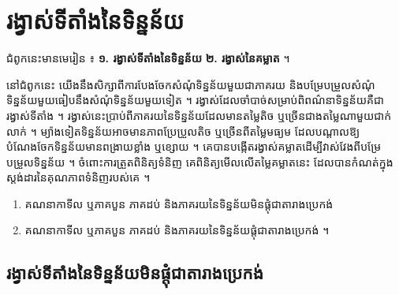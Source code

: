 \chapter{រង្វាស់ទីតាំងនៃទិន្នន័យ}

\begin{note}[ជំពូកទី ៧ ៖ ស្ថិតិ]
ជំពូកនេះមានមេរៀន ៖ \textbf{១. រង្វាស់ទីតាំងនៃទិន្នន័យ} \quad \textbf{២. រង្វាស់នៃគម្លាត} ។

នៅជំពូកនេះ យើងនឹងសិក្សាពីការបែងចែកសំណុំទិន្នន័យមួយជាភាគរយ និងបម្រែបម្រួលសំណុំទិន្នន័យមួយធៀបនឹងសំណុំទិន្នន័យមួយទៀត ។ រង្វាស់ដែលចាំបាច់សម្រាប់ពិពណ៌នាទិន្នន័យគឺជារង្វាស់ទីតាំង ។ រង្វាស់នេះប្រាប់ពីភាគរយនៃទិន្នន័យដែលមានតម្លៃតិច ឬច្រើនជាងតម្លៃណាមួយជាក់លាក់ ។ ម្យ៉ាងទៀតទិន្នន័យអាចមានភាពប្រែប្រួលតិច ឬច្រើនពីតម្លៃមធ្យម ដែលបណ្ដាលឱ្យបំណែងចែកទិន្នន័យមានពង្រាយខ្លាំង ឬខ្សោយ ។ គេបានបង្កើតរង្វាស់គម្លាតដើម្បីវាស់វែងពីបម្រែបម្រួលទិន្នន័យ ។ ចំពោះការត្រួតពិនិត្យទំនិញ គេពិនិត្យមើលលើតម្លៃគម្លាតនេះ ដែលបានកំណត់ក្នុងស្តង់ដារនៃគុណភាពទំនិញរបស់គេ ។
\end{note}

\begin{objBox}[វត្ថុបំណង]
\begin{enumerate}[1]
  \item គណនាកាទីល ឬភាគបួន ភាគដប់ និងភាគរយនៃទិន្នន័យមិនផ្ដុំជាតារាងប្រេកង់
  \item គណនាកាទីល ឬភាគបួន ភាគដប់ និងភាគរយនៃទិន្នន័យផ្ដុំជាតារាងប្រេកង់ ។
\end{enumerate}
\end{objBox}

\section{រង្វាស់ទីតាំងនៃទិន្នន័យមិនផ្ដុំជាតារាងប្រេកង់}

